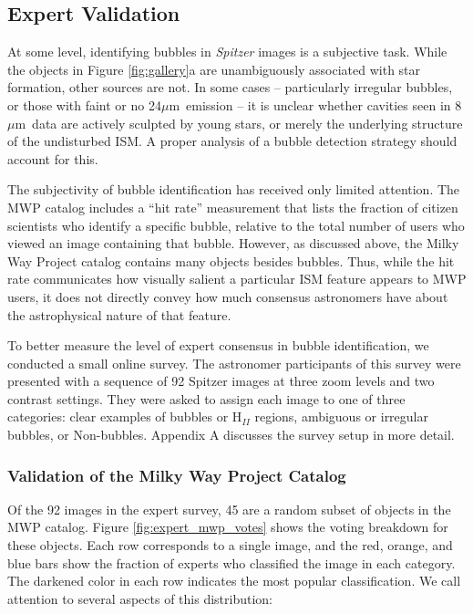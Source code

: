 \documentclass[preprint]{aastex}
\newcommand{\um}[0]{$\mu$m}
\begin{document}
\subsection{Expert Validation}

At some level, identifying bubbles in \textit{Spitzer} images is a subjective task. While the objects in Figure \ref{fig:gallery}a are unambiguously associated with star formation, other sources are not. In some cases -- particularly irregular bubbles, or those with faint or no 24\um\, emission -- it is unclear whether cavities seen in 8 \um\, data are actively sculpted by young stars, or merely the underlying structure of the undisturbed ISM. A proper analysis of a bubble detection strategy should account for this.

The subjectivity of bubble identification has received only limited attention. The MWP catalog includes a ``hit rate'' measurement that lists the fraction of citizen scientists who identify a specific bubble, relative to the total number of users who viewed an image containing that bubble. However, as discussed above, the Milky Way Project catalog contains many objects besides bubbles. Thus, while the hit rate communicates how visually salient a particular ISM feature appears to MWP users, it does not directly convey how much consensus astronomers have about the astrophysical nature of that feature.

To better measure the level of expert consensus in bubble identification, we conducted a small online survey. The astronomer participants of this survey were presented with a sequence of 92 Spitzer images at three zoom levels and two contrast settings. They were asked to assign each image to one of three categories: clear examples of bubbles or H$_{II}$ regions, ambiguous or irregular bubbles, or Non-bubbles. Appendix A discusses the survey setup in more detail.

\subsubsection{Validation of the Milky Way Project Catalog}
\label{sec:expert_mwp}
Of the 92 images in the expert survey, 45 are a random subset of objects in the MWP catalog. Figure \ref{fig:expert_mwp_votes} shows the voting breakdown for these objects. Each row corresponds to a single image, and the red, orange, and blue bars show the fraction of experts who classified the image in each category. The darkened color in each row indicates the most popular classification.  We call attention to several aspects of this distribution: 
\end{document}
